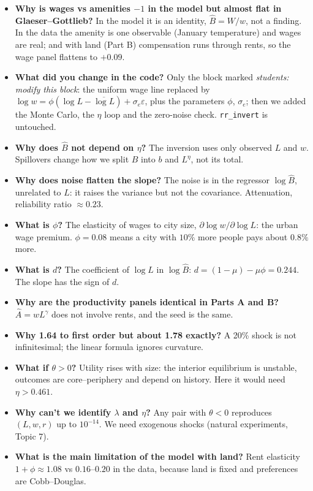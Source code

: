 \documentclass[11pt,a4paper]{article}
\begin{document}
\begin{ask}
\begin{itemize}[leftmargin=12pt,itemsep=4pt,topsep=2pt]
\item \textbf{Why is wages vs amenities $-1$ in the model but almost flat in Glaeser--Gottlieb?} In the model it is an identity, $\hat B = W/w$, not a finding. In the data the amenity is one observable (January temperature) and wages are real; and with land (Part B) compensation runs through rents, so the wage panel flattens to $+0.09$.
\item \textbf{What did you change in the code?} Only the block marked \emph{students: modify this block}: the uniform wage line replaced by $\log w = \phi(\log L - \overline{\log L}) + \sigma_e\varepsilon$, plus the parameters $\phi$, $\sigma_e$; then we added the Monte Carlo, the $\eta$ loop and the zero-noise check. \texttt{rr\_invert} is untouched.
\item \textbf{Why does $\hat B$ not depend on $\eta$?} The inversion uses only observed $L$ and $w$. Spillovers change how we split $B$ into $b$ and $L^\eta$, not its total.
\item \textbf{Why does noise flatten the slope?} The noise is in the regressor $\log\hat B$, unrelated to $L$: it raises the variance but not the covariance. Attenuation, reliability ratio $\approx 0.23$.
\item \textbf{What is $\phi$?} The elasticity of wages to city size, $\partial\log w/\partial\log L$: the urban wage premium. $\phi = 0.08$ means a city with $10\%$ more people pays about $0.8\%$ more.
\item \textbf{What is $d$?} The coefficient of $\log L$ in $\log\hat B$: $d = (1-\mu)-\mu\phi = 0.244$. The slope has the sign of $d$.
\item \textbf{Why are the productivity panels identical in Parts A and B?} $\hat A = wL^\gamma$ does not involve rents, and the seed is the same.
\item \textbf{Why 1.64 to first order but about 1.78 exactly?} A 20\% shock is not infinitesimal; the linear formula ignores curvature.
\item \textbf{What if $\theta > 0$?} Utility rises with size: the interior equilibrium is unstable, outcomes are core--periphery and depend on history. Here it would need $\eta > 0.461$.
\item \textbf{Why can't we identify $\lambda$ and $\eta$?} Any pair with $\theta<0$ reproduces $(L,w,r)$ up to $10^{-14}$. We need exogenous shocks (natural experiments, Topic 7).
\item \textbf{What is the main limitation of the model with land?} Rent elasticity $1+\phi \approx 1.08$ vs $0.16$--$0.20$ in the data, because land is fixed and preferences are Cobb--Douglas.
\end{itemize}
\end{ask}
\end{document}
